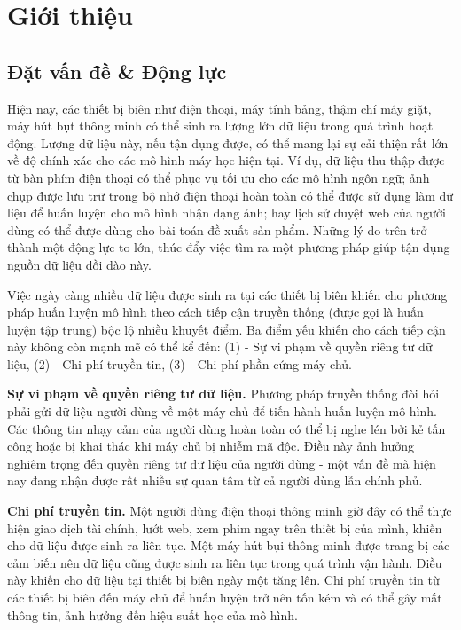 \chapter{Giới thiệu}
\label{Chapter1}

\section{Đặt vấn đề \& Động lực}

Hiện nay, các thiết bị biên như điện thoại, máy tính bảng, thậm chí máy giặt, máy hút bụt thông minh có thể sinh ra lượng lớn dữ liệu trong quá trình hoạt động. Lượng dữ liệu này, nếu tận dụng được, có thể mang lại sự cải thiện rất lớn về độ chính xác cho các mô hình máy học hiện tại. Ví dụ, dữ liệu thu thập được từ bàn phím điện thoại có thể phục vụ tối ưu cho các mô hình ngôn ngữ; ảnh chụp được lưu trữ trong bộ nhớ điện thoại hoàn toàn có thể được sử dụng làm dữ liệu để huấn luyện cho mô hình nhận dạng ảnh; hay lịch sử duyệt web của người dùng có thể được dùng cho bài toán đề xuất sản phẩm. Những lý do trên trở thành một động lực to lớn, thúc đẩy việc tìm ra một phương pháp giúp tận dụng nguồn dữ liệu dồi dào này.

Việc ngày càng nhiều dữ liệu được sinh ra tại các thiết bị biên khiến cho phương pháp huấn luyện mô hình theo cách tiếp cận truyền thống (được gọi là huấn luyện tập trung) bộc lộ nhiều khuyết điểm. Ba điểm yếu khiến cho cách tiếp cận này không còn mạnh mẽ có thể kể đến: (1) - Sự vi phạm về quyền riêng tư dữ liệu, (2) - Chi phí truyền tin, (3) - Chi phí phần cứng máy chủ.

\textbf{Sự vi phạm về quyền riêng tư dữ liệu.} Phương pháp truyền thống đòi hỏi phải gửi dữ liệu người dùng về một máy chủ để tiến hành huấn luyện mô hình. Các thông tin nhạy cảm của người dùng hoàn toàn có thể bị nghe lén bởi kẻ tấn công hoặc bị khai thác khi máy chủ bị nhiễm mã độc. Điều này ảnh hưởng nghiêm trọng đến quyền riêng tư dữ liệu của người dùng - một vấn đề mà hiện nay đang nhận được rất nhiều sự quan tâm từ cả người dùng lẫn chính phủ.

\textbf{Chi phí truyền tin.} Một người dùng điện thoại thông minh giờ đây có thể thực hiện giao dịch tài chính, lướt web, xem phim ngay trên thiết bị của mình, khiến cho dữ liệu được sinh ra liên tục. Một máy hút bụi thông minh được trang bị các cảm biến nên dữ liệu cũng được sinh ra liên tục trong quá trình vận hành. Điều này khiến cho dữ liệu tại thiết bị biên ngày một tăng lên. Chi phí truyền tin từ các thiết bị biên đến máy chủ để huấn luyện trở nên tốn kém và có thể gây mất thông tin, ảnh hưởng đến hiệu suất học của mô hình.

